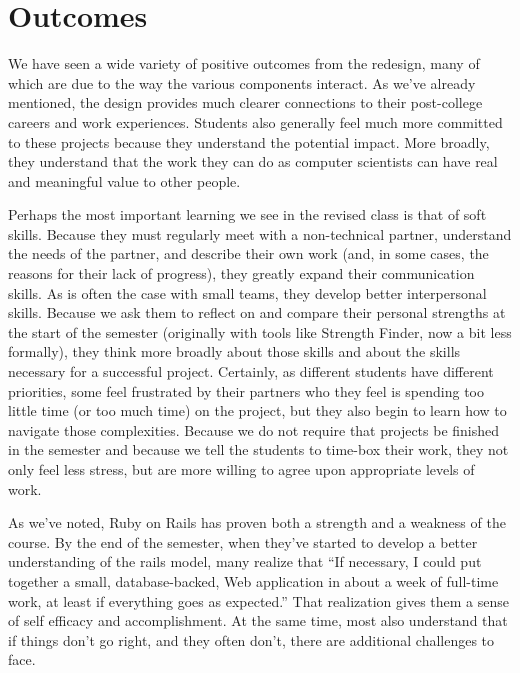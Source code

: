 \section{Outcomes}

We have seen a wide variety of positive outcomes from the redesign,
many of which are due to the way the various components interact.
As we've already mentioned, the design provides much clearer
connections to their post-college careers and work experiences.
Students also generally feel much more committed to these projects
because they understand the potential impact.  More broadly, they
understand that the work they can do as computer scientists can
have real and meaningful value to other people.

Perhaps the most important learning we see in the revised class is
that of soft skills.  Because they must regularly meet with a
non-technical partner, understand the needs of the partner, and
describe their own work (and, in some cases, the reasons for their
lack of progress), they greatly expand their communication skills.
As is often the case with small teams, they develop better interpersonal
skills.  Because we ask them to reflect on and compare their personal
strengths at the start of the semester (originally with tools like
Strength Finder, now a bit less formally), they think more broadly
about those skills and about the skills necessary for a successful
project.  Certainly, as different students have different priorities,
some feel frustrated by their partners who they feel is spending
too little time (or too much time) on the project, but they also
begin to learn how to navigate those complexities.  Because we do
not require that projects be finished in the semester and because
we tell the students to time-box their work, they not only feel
less stress, but are more willing to agree upon appropriate levels
of work.

As we've noted, Ruby on Rails has proven both a strength and a weakness
of the course.  By the end of the semester, when they've started to develop
a better understanding of the rails model, many realize that ``If
necessary, I could put together a small, database-backed, Web application
in about a week of full-time work, at least if everything goes as
expected.''  That realization gives them a sense of self efficacy
and accomplishment.  At the same time, most also understand that if things
don't go right, and they often don't, there are additional challenges
to face.

